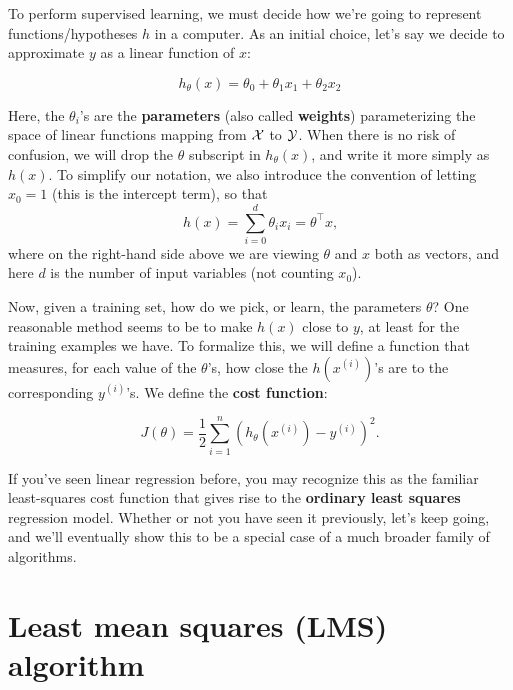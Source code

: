 To perform supervised learning, we must decide how we're going to represent
functions/hypotheses $h$ in a computer. As an initial choice, let's say
we decide to approximate $y$ as a linear function of $x$:

\begin{equation}
    h_\theta(x) = \theta_0 + \theta_1 x_1 + \theta_2 x_2
\end{equation}

Here, the $\theta_i$'s are the \textbf{parameters} (also called \textbf{weights}) parameterizing the
space of linear functions mapping from $\cal X$ to $\cal Y$. When there is no risk of
confusion, we will drop the $\theta$ subscript in $h_\theta(x)$, and write it more simply as
$h(x)$. To simplify our notation, we also introduce the convention of letting
$x_0 = 1$ (this is the intercept term), so that
\begin{equation}
    h(x) = \sum_{i=0}^d \theta_i x_i = \theta^\top x\text{,} %
\end{equation}
where on the right-hand side above we are viewing $\theta$ and $x$ both as vectors,
and here $d$ is the number of input variables (not counting $x_0$).

Now, given a training set, how do we pick, or learn, the parameters $\theta$?
One reasonable method seems to be to make $h(x)$ close to $y$, at least for
the training examples we have. To formalize this, we will define a function
that measures, for each value of the $\theta$'s, how close the $h(x^{(i)})$'s are to the
corresponding $y^{(i)}$'s. We define the \textbf{cost function}:

\begin{equation}
    J(\theta) = \frac 1 2 \sum_{i=1}^n \left( h_\theta(x^{(i)}) - y^{(i)} \right)^2\text{.}
\end{equation}

If you've seen linear regression before, you may recognize this as the familiar
least-squares cost function that gives rise to the \textbf{ordinary least squares}
regression model. Whether or not you have seen it previously, let's keep
going, and we'll eventually show this to be a special case of a much broader
family of algorithms.


\section{Least mean squares (LMS) algorithm} %

